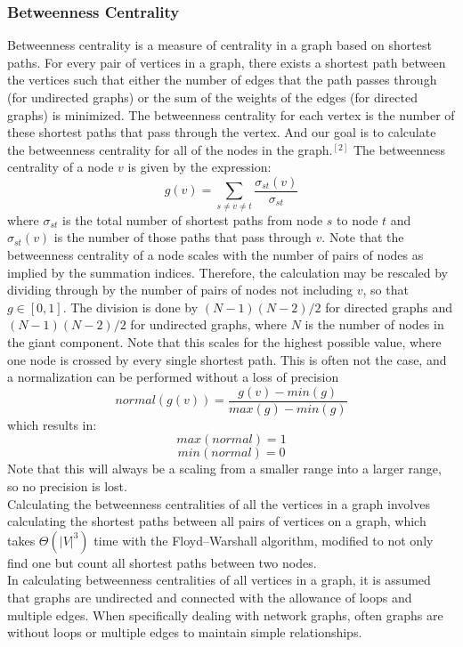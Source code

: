 \documentclass{article}
\begin{document}
\subsubsection{Betweenness Centrality}
Betweenness centrality is a measure of centrality in a graph based on shortest paths. For every pair of vertices in a graph, there exists a shortest path between the vertices such that either the number of edges that the path passes through (for undirected graphs) or the sum of the weights of the edges (for directed graphs) is minimized. The betweenness centrality for each vertex is the number of these shortest paths that pass through the vertex. And our goal is to calculate the betweenness centrality for all of the nodes in the graph.$^{[2]}$
The betweenness centrality of a node \mbox{\boldmath $v$} is given by the expression:
\[g(v) = \sum_{s\neq v\neq t}\frac{\sigma_{st}(v)}{\sigma_{st}}\]
where \mbox{\boldmath $\sigma_{st}$} is the total number of shortest paths from node \mbox{\boldmath $s$} to node \mbox{\boldmath $t$} and \mbox{\boldmath $\sigma_{st}(v)$} is the number of those paths that pass through \mbox{\boldmath $v$}.
Note that the betweenness centrality of a node scales with the number of pairs of nodes as implied by the summation indices. Therefore, the calculation may be rescaled by dividing through by the number of pairs of nodes not including \mbox{\boldmath $v$}, so that \mbox{\boldmath $g \in [0,1]$}. The division is done by \mbox{\boldmath $(N - 1)(N - 2)/2$} for directed graphs and \mbox{\boldmath $(N - 1)(N - 2)/2$} for undirected graphs, where \mbox{\boldmath $N$} is the number of nodes in the giant component. Note that this scales for the highest possible value, where one node is crossed by every single shortest path. This is often not the case, and a normalization can be performed without a loss of precision
\[normal(g(v)) = \frac{g(v) - min(g)}{max(g) - min(g)}\]
which results in:
\[max(normal) = 1\]
\[min(normal) = 0\]
Note that this will always be a scaling from a smaller range into a larger range, so no precision is lost.\\
Calculating the betweenness centralities of all the vertices in a graph involves calculating the shortest paths between all pairs of vertices on a graph, which takes ${\displaystyle \Theta (|V|^{3})}$ time with the Floyd–Warshall algorithm, modified to not only find one but count all shortest paths between two nodes.\\
In calculating betweenness centralities of all vertices in a graph, it is assumed that graphs are undirected and connected with the allowance of loops and multiple edges. When specifically dealing with network graphs, often graphs are without loops or multiple edges to maintain simple relationships.\\
\end{document}
